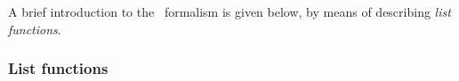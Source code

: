 
A brief introduction to the \asdf\ formalism is given below,
by means of describing {\em list functions}.

\subsubsection{List functions}

